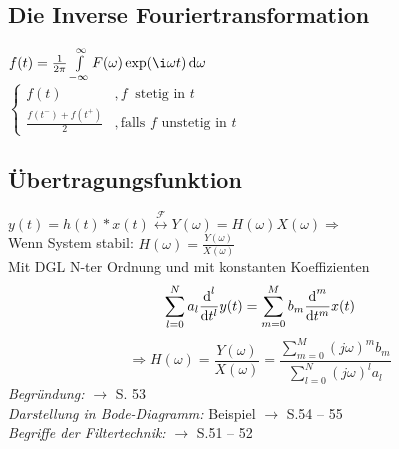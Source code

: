 \documentclass[german]{latex4ei/latex4ei_sheet}
\renewcommand{\diff}{\mathop{}\!\mathrm{\vphantom( d}}
\begin{document}
\begin{minipage}{\columnwidth}
\begin{sectionbox}
	\subsection*{Die Inverse Fouriertransformation}
	$f(t) = \frac{1}{2\pi} \int\limits_{-\infty}^\infty F(\omega) \exp(\i \omega t) \diff \omega$\\
	$\begin{cases} f(t) & ,f\ \text{ stetig in }t \\ \frac{f(t^-) + f(t^+)}{2} & ,\text{falls } f\text{ unstetig in }t \end{cases}$
	
	\subsection*{Übertragungsfunktion}
	$\boxed{y(t) = h(t) \ast x(t) \stackrel{\mathcal{F}}{\longleftrightarrow} Y(\omega) = H(\omega) X(\omega)} \Rightarrow$\\
	Wenn System stabil:	$\boxed{H(\omega) = \frac{Y(\omega)}{X(\omega)}}$\\
	Mit DGL N-ter Ordnung und mit konstanten Koeffizienten
	\[\sum\limits_{l = 0}^{N}{a_l \frac{\diff^l}{\diff t^l} y(t)} = \sum\limits_{m = 0}^{M}{b_m \frac{\diff^m}{\diff t^m} x(t)}\]
	\[\Rightarrow \boxed{H(\omega) = \frac{Y(\omega)}{X(\omega)} = \frac{\sum\limits_{m = 0}^{M}{(j\omega)^m b_m}}{\sum\limits_{l = 0}^{N}{(j\omega)^l a_l}}}\]
	\emph{Begründung:} $\rightarrow$ S. 53\\
	\emph{Darstellung in Bode-Diagramm:} Beispiel $\rightarrow$ S.54 -- 55\\
	\emph{Begriffe der Filtertechnik:} $\rightarrow$ S.51 -- 52
\end{sectionbox}
\end{minipage}
	
\end{document}

